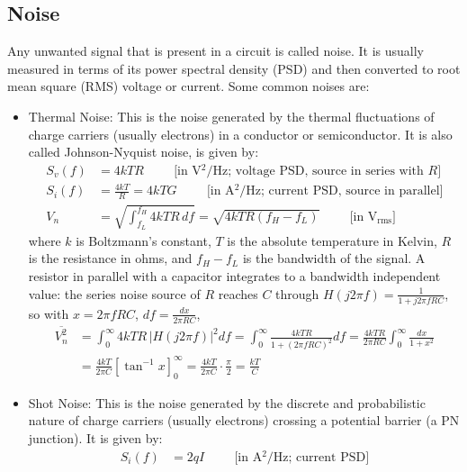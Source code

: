 \subsection{Noise}\label{sec:theory_general_noise}
Any unwanted signal that is present in a circuit is called noise. It is
usually measured in terms of its power spectral density (PSD) and then
converted to root mean square (RMS) voltage or current. Some common noises
are:
\begin{itemize}
  \item Thermal Noise: This is the noise generated by the thermal fluctuations
    of charge carriers (usually electrons) in a conductor or semiconductor.
    It is also called Johnson-Nyquist noise, is given by:
    \begin{align*}
      S_v(f) &= 4 k T R \hspace{1cm} \text{[in V\(^2\)/Hz; voltage PSD, source in series with \(R\)]} \\
      S_i(f) &= \frac{4 k T}{R} = 4kTG \hspace{1cm} \text{[in A\(^2\)/Hz; current PSD, source in parallel]} \\
      V_n &= \sqrt{\int_{f_L}^{f_H} 4 k T R \, df} = \sqrt{4 k T R (f_H - f_L)} \hspace{1cm} \text{[in V\(_{\text{rms}}\)]}
    \end{align*}
    where \(k\) is Boltzmann's constant, \(T\) is the absolute temperature in
    Kelvin, \(R\) is the resistance in ohms, and \(f_H - f_L\) is the
    bandwidth of the signal. A resistor in parallel with a capacitor
    integrates to a bandwidth independent value: the series noise source of
    \(R\) reaches \(C\) through \(H(j2\pi f) = \frac{1}{1 + j2\pi f RC}\), so with
    \(x = 2\pi f RC\), \(df = \frac{dx}{2\pi RC}\),
    \begin{align*}
      \overline{V_n^2} &= \int_0^\infty 4kTR\,|H(j2\pi f)|^2 df = \int_0^\infty \frac{4kTR}{1 + (2\pi f R C)^2} df
      = \frac{4kTR}{2\pi RC}\int_0^\infty \frac{dx}{1 + x^2} \\
      &= \frac{4kT}{2\pi C}\left[\tan^{-1}x\right]_0^\infty = \frac{4kT}{2\pi C}\cdot\frac{\pi}{2} = \frac{kT}{C}
    \end{align*}
  \item Shot Noise: This is the noise generated by the discrete and probabilistic
    nature of charge carriers (usually electrons) crossing a potential barrier
    (a PN junction). It is given by:
    \begin{align*}
      S_i(f) &= 2 q I \hspace{1cm} \text{[in A\(^2\)/Hz; current PSD]} \\

\end{align*}
\end{itemize}
